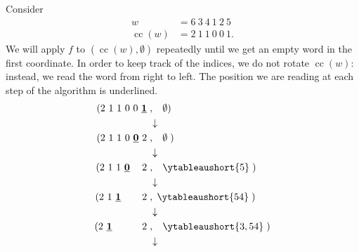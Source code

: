 \documentclass[ALCO, Unicode]{cedram}
\DeclareMathOperator{\cc}{cc}
\begin{document}
\begin{ex}\label{ex: cat alg}
    Consider \begin{align*}
        w &=  6 \ 3 \ 4  \ 1 \ 2\ 5  \\ 
        \cc(w) &=  2 \ 1 \ 1 \ 0 \ 0 \ 1 .
    \end{align*}
    We will apply $f$ to $(\cc(w),\emptyset)$ repeatedly until we get an empty word in the first coordinate.
In order to keep track of the indices, we do not rotate $\cc(w)$: instead, we read the word from right to left. The position we are reading at each step of the algorithm is underlined. 
     {\allowdisplaybreaks\begin{align*}
          ( 2 \ 1 \ 1 \ 0 \ 0 \ \mathbf{\underline{1}} \hspace{.1cm}&, \hspace{.3cm} \emptyset) \\ &\downarrow\\ 
     ( 2 \ 1 \ 1 \ 0 \ \mathbf{\underline{0}} \ 2\hspace{.1cm} &, \hspace{.3cm}\emptyset \hspace{.1cm}) \\ &\downarrow\\ 
     ( 2 \ 1 \ 1 \  \mathbf{\underline{0}} \ \hspace{.2cm} \ 2 \hspace{.1cm}&, \hspace{.3cm} \ytableaushort{5} \hspace{.1cm}) 
      \\ &\downarrow\\ 
     ( 2 \ 1 \ \mathbf{\underline{1}} \  \hspace{.2cm} \ \hspace{.2cm} \ 2 \hspace{.1cm}&,\hspace{.1cm} \ytableaushort{54}\hspace{.1cm}) \\ &\downarrow\\ 
     ( 2 \ \mathbf{\underline{1}} \  \hspace{.2cm}  \  \hspace{.2cm} \ \hspace{.2cm} \ 2\hspace{.1cm} &, \hspace{.3cm}\ytableaushort{3,54}\hspace{.1cm}) 
      \\ &\downarrow\\ 

\end{align*}}
\end{ex}
\end{document}
